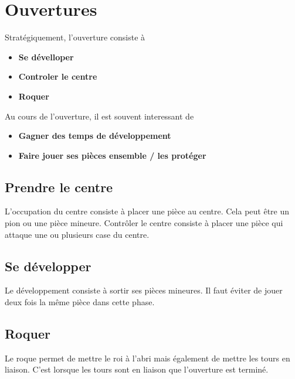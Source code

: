 
\section{Ouvertures}
%
Stratégiquement, l'ouverture consiste à

\begin{itemize}[leftmargin=2.7cm, label=, itemsep=0pt]%
\item  {\bf Se dévelloper}
\item  {\bf Controler le centre}
\item  {\bf Roquer}
\end{itemize}

Au cours de l'ouverture, il est souvent interessant de
\begin{itemize}[leftmargin=2.7cm, label=, itemsep=0pt]%
\item  {\bf Gagner des  temps de développement}
\item  {\bf Faire jouer ses pièces ensemble / les protéger}
\end{itemize}

\subsection{Prendre le centre}
%
L'occupation du centre consiste à placer une pièce au centre. Cela peut être un pion ou une pièce mineure. Contrôler le centre consiste à placer une pièce qui attaque une ou plusieurs case du centre.


\subsection{Se développer}
%
Le développement consiste à sortir ses pièces mineures. Il faut éviter de jouer deux fois la même pièce dans cette phase.


\subsection{Roquer}
%
Le roque permet de mettre le roi à l'abri mais également de mettre les tours en liaison. C'est lorsque les tours sont en liaison que l'ouverture est terminé.


